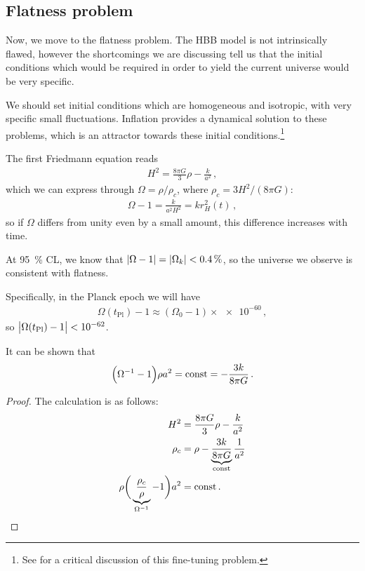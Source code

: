 \documentclass[main.tex]{subfiles}
\begin{document}
\subsection{Flatness problem}

Now, we move to the flatness problem. 
The HBB model is not intrinsically flawed, however the shortcomings we are discussing tell us that the initial conditions which would be required in order to yield the current universe would be very specific.

We should set initial conditions which are homogeneous and isotropic, with very specific small fluctuations. Inflation provides a dynamical solution to these problems, which is an attractor towards these initial conditions.\footnote{See \textcite[]{hossenfelderScreamsExplanationFinetuning2019} for a critical discussion of this fine-tuning problem.}

The first Friedmann equation reads 
%
\begin{align}
H^2=  \frac{8 \pi G}{3} \rho - \frac{k}{a^2}
\,,
\end{align}
%
which we can express through \(\Omega = \rho / \rho _c\), where \(\rho _c = 3 H^2 / (8 \pi G) \): 
%
\begin{align}
\Omega - 1 = \frac{k}{a^2 H^2} = k r_H^2 (t)
\,,
\end{align}
%
so if \(\Omega \) differs from unity even by a small amount, this difference increases with time. 

At \SI{95}{\percent} CL, we know that \(\abs{\Omega - 1} = \abs{\Omega _k} < \SI{.4}{\percent}\), so the universe we observe is consistent with flatness. 

Specifically, in the Planck epoch we will have 
%
\begin{align}
\Omega (t _{\text{Pl}}) - 1 \approx  (\Omega_0 - 1) \times \num{e-60}
\,,
\end{align}
%
so \(\abs{\Omega (t _{\text{Pl}}) - 1} < \num{e-62}\).

\begin{claim}
It can be shown that 
%
\begin{align}
\qty(\Omega^{-1} - 1) \rho a^2 = \text{const} = -\frac{3k}{8 \pi G}
\,.
\end{align}
\end{claim}
\begin{proof}
The calculation is as follows: 
%
\begin{align}
H^2 &= \frac{8 \pi G}{3} \rho - \frac{k}{a^2}  \\
\rho _c &= \rho - \underbrace{\frac{3 k}{8 \pi G}}_{\text{const}} \frac{1}{a^2}  \\
\rho \bigg( \underbrace{\frac{\rho _c}{\rho }}_{\Omega^{-1}} - 1\bigg) a^2 &= \text{const}
\,.
\end{align}

\end{proof}
\end{document}
